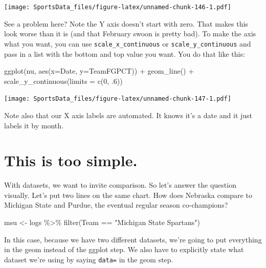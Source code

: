 \documentclass[
]{book}
\newenvironment{Shaded}{\begin{snugshade}}{\end{snugshade}}
\newcommand{\AttributeTok}[1]{\textcolor[rgb]{0.77,0.63,0.00}{#1}}
\newcommand{\DecValTok}[1]{\textcolor[rgb]{0.00,0.00,0.81}{#1}}
\newcommand{\FunctionTok}[1]{\textcolor[rgb]{0.00,0.00,0.00}{#1}}
\newcommand{\NormalTok}[1]{#1}
\newcommand{\OtherTok}[1]{\textcolor[rgb]{0.56,0.35,0.01}{#1}}
\newcommand{\SpecialCharTok}[1]{\textcolor[rgb]{0.00,0.00,0.00}{#1}}
\newcommand{\StringTok}[1]{\textcolor[rgb]{0.31,0.60,0.02}{#1}}
\begin{document}
\texttt{[image: SportsData\_files/figure-latex/unnamed-chunk-146-1.pdf]}

See a problem here? Note the Y axis doesn't start with zero. That makes this look worse than it is (and that February swoon is pretty bad). To make the axis what you want, you can use \texttt{scale\_x\_continuous} or \texttt{scale\_y\_continuous} and pass in a list with the bottom and top value you want. You do that like this:

\begin{Shaded}
\begin{Highlighting}[]
\FunctionTok{ggplot}\NormalTok{(nu, }\FunctionTok{aes}\NormalTok{(}\AttributeTok{x=}\NormalTok{Date, }\AttributeTok{y=}\NormalTok{TeamFGPCT)) }\SpecialCharTok{+} \FunctionTok{geom\_line}\NormalTok{() }\SpecialCharTok{+} \FunctionTok{scale\_y\_continuous}\NormalTok{(}\AttributeTok{limits =} \FunctionTok{c}\NormalTok{(}\DecValTok{0}\NormalTok{, .}\DecValTok{6}\NormalTok{))}
\end{Highlighting}
\end{Shaded}

\texttt{[image: SportsData\_files/figure-latex/unnamed-chunk-147-1.pdf]}

Note also that our X axis labels are automated. It knows it's a date and it just labels it by month.

\hypertarget{this-is-too-simple.}{%
\section{This is too simple.}\label{this-is-too-simple.}}

With datasets, we want to invite comparison. So let's answer the question visually. Let's put two lines on the same chart. How does Nebraska compare to Michigan State and Purdue, the eventual regular season co-champions?

\begin{Shaded}
\begin{Highlighting}[]
\NormalTok{msu }\OtherTok{\textless{}{-}}\NormalTok{ logs }\SpecialCharTok{\%\textgreater{}\%} \FunctionTok{filter}\NormalTok{(Team }\SpecialCharTok{==} \StringTok{"Michigan State Spartans"}\NormalTok{)}
\end{Highlighting}
\end{Shaded}

In this case, because we have two different datasets, we're going to put everything in the geom instead of the ggplot step. We also have to explicitly state what dataset we're using by saying \texttt{data=} in the geom step.
\end{document}
